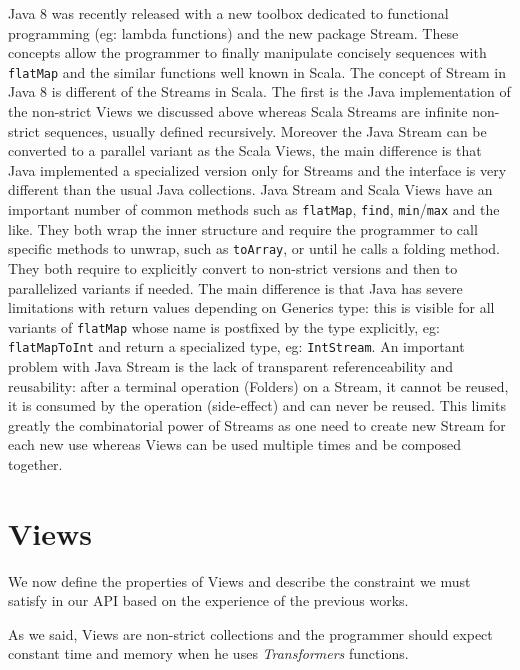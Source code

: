 \documentclass[a4paper,12pt,twocolumn]{article}
\begin{document}
Java 8 was recently released with a new toolbox dedicated to functional programming (eg: lambda functions) and the new package Stream.
These concepts allow the programmer to finally manipulate concisely sequences with \verb|flatMap| and the similar functions well known in Scala.
The concept of Stream in Java 8 is different of the Streams in Scala.
The first is the Java implementation of the non-strict Views we discussed above whereas Scala Streams are infinite non-strict sequences, usually defined recursively.
Moreover the Java Stream can be converted to a parallel variant as the Scala Views, the main difference is that Java implemented a specialized version only for Streams and the interface is very different than the usual Java collections.
Java Stream and Scala Views have an important number of common methods such as \verb|flatMap|, \verb|find|, \verb|min|/\verb|max| and the like.
They both wrap the inner structure and require the programmer to call specific methods to unwrap, such as \verb|toArray|, or until he calls a folding method.
They both require to explicitly convert to non-strict versions and then to parallelized variants if needed.
The main difference is that Java has severe limitations with return values depending on Generics type: this is visible for all variants of \verb|flatMap| whose name is postfixed by the type explicitly, eg: \verb|flatMapToInt| and return a specialized type, eg: \verb|IntStream|.
An important problem with Java Stream is the lack of transparent referenceability and reusability: after a terminal operation (Folders) on a Stream, it cannot be reused, it is consumed by the operation (side-effect) and can never be reused.
This limits greatly the combinatorial power of Streams as one need to create new Stream for each new use whereas Views can be used multiple times and be composed together.

\section{Views}
We now define the properties of Views and describe the constraint we must satisfy in our API based on the experience of the previous works.

As we said, Views are non-strict collections and the programmer should expect constant time and memory when he uses {\it Transformers} functions.
\end{document}
